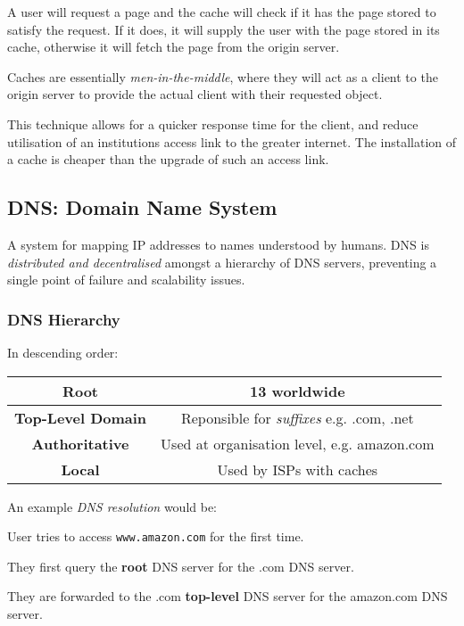 \documentclass{article}
\begin{document}
A user will request a page and the cache will check if it has the page stored to satisfy the request. If it does, it will supply the user with the page stored in its cache, otherwise it will fetch the page from the origin server.

Caches are essentially \textit{men-in-the-middle}, where they will act as a client to the origin server to provide the actual client with their requested object.

This technique allows for a quicker response time for the client, and reduce utilisation of an institutions access link to the greater internet. The installation of a cache is cheaper than the upgrade of such an access link.

\subsection{DNS: Domain Name System}

A system for mapping IP addresses to names understood by humans. DNS is \textit{distributed and decentralised} amongst a hierarchy of DNS servers, preventing a single point of failure and scalability issues.

\subsubsection{DNS Hierarchy}

In descending order:

\begin{center}
  \begin{tabular}{|c|c|}
    \hline
    \textbf{Root} & 13 worldwide\\
    \hline
    \textbf{Top-Level Domain} & Reponsible for \textit{suffixes} e.g. .com, .net\\
    \hline
    \textbf{Authoritative} & Used at organisation level, e.g. amazon.com\\
    \hline
    \textbf{Local} & Used by ISPs with caches\\
    \hline
  \end{tabular}
\end{center}

An example \textit{DNS resolution} would be:

User tries to access \texttt{www.amazon.com} for the first time.

They first query the \textbf{root} DNS server for the .com DNS server.

They are forwarded to the .com \textbf{top-level} DNS server for the amazon.com DNS server.
\end{document}
